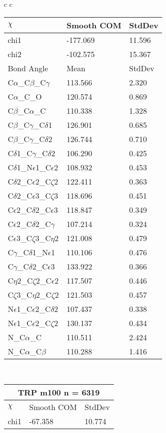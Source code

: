\begin{longtable}{ c c }
\begin{tabular}{ l l l }
  $\chi$       & Smooth COM & StdDev \\ \midrule
  chi1 & -177.069 & 11.596 \\ 
  chi2 & -102.575 & 15.367 \\ \midrule
  Bond Angle   & Mean     & StdDev \\ \midrule
  C$\alpha$\_C$\beta$\_C$\gamma$ & 113.566 & 2.320\\
  C$\alpha$\_C\_O & 120.574 & 0.869\\
  C$\beta$\_C$\alpha$\_C & 110.338 & 1.328\\
  C$\beta$\_C$\gamma$\_C$\delta$1 & 126.901 & 0.685\\
  C$\beta$\_C$\gamma$\_C$\delta$2 & 126.744 & 0.710\\
  C$\delta$1\_C$\gamma$\_C$\delta$2 & 106.290 & 0.425\\
  C$\delta$1\_N$\epsilon$1\_C$\epsilon$2 & 108.932 & 0.453\\
  C$\delta$2\_C$\epsilon$2\_C$\zeta$2 & 122.411 & 0.363\\
  C$\delta$2\_C$\epsilon$3\_C$\zeta$3 & 118.696 & 0.451\\
  C$\epsilon$2\_C$\delta$2\_C$\epsilon$3 & 118.847 & 0.349\\
  C$\epsilon$2\_C$\delta$2\_C$\gamma$ & 107.214 & 0.324\\
  C$\epsilon$3\_C$\zeta$3\_C$\eta$2 & 121.008 & 0.479\\
  C$\gamma$\_C$\delta$1\_N$\epsilon$1 & 110.106 & 0.476\\
  C$\gamma$\_C$\delta$2\_C$\epsilon$3 & 133.922 & 0.366\\
  C$\eta$2\_C$\zeta$2\_C$\epsilon$2 & 117.507 & 0.446\\
  C$\zeta$3\_C$\eta$2\_C$\zeta$2 & 121.503 & 0.457\\
  N$\epsilon$1\_C$\epsilon$2\_C$\delta$2 & 107.437 & 0.338\\
  N$\epsilon$1\_C$\epsilon$2\_C$\zeta$2 & 130.137 & 0.434\\
  N\_C$\alpha$\_C & 110.511 & 2.424\\
  N\_C$\alpha$\_C$\beta$ & 110.288 & 1.416\\
  \bottomrule
  \end{tabular}
  \\
  \begin{tabular}{ l l l }
  \toprule
  \multicolumn{3}{c}{TRP \textbf{m100} n = 6319} \\ \toprule
  $\chi$       & Smooth COM & StdDev \\ \midrule
  chi1 & -67.358 & 10.774 \\ 

\end{tabular}
\end{longtable}
